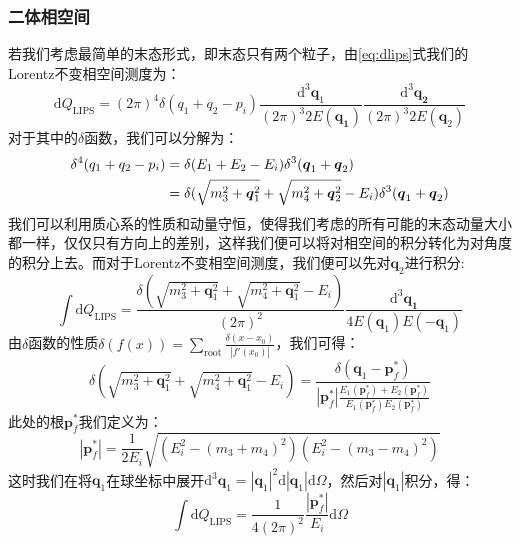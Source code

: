 \subsubsection*{二体相空间}
若我们考虑最简单的末态形式，即末态只有两个粒子，由\eqref{eq:dlips}式我们的Lorentz不变相空间测度为：
\begin{equation}
\mathrm{d}Q_{\text{LIPS}}=(2\pi)^4\delta(q_1+q_2-p_i)\frac{\mathrm{d}^3\boldsymbol{q}_1}{(2\pi)^3 2E(\boldsymbol{q_1})}\frac{\mathrm{d}^3\boldsymbol{q_2}}{(2\pi)^3 2E(\boldsymbol{q}_2)}
\end{equation}
对于其中的$\delta$函数，我们可以分解为：
\begin{align}
\delta^4(q_1+q_2-p_i)&=\delta(E_1+E_2-E_i)\delta^3(\boldsymbol{q}_1+\boldsymbol{q}_2)\notag\\
&=\delta(\sqrt{m_3^2+\boldsymbol{q}_1^2}+\sqrt{m_4^2+\boldsymbol{q}_2^2}-E_i)\delta^3(\boldsymbol{q}_1+\boldsymbol{q}_2)
\end{align}
我们可以利用质心系的性质和动量守恒，使得我们考虑的所有可能的末态动量大小都一样，仅仅只有方向上的差别，这样我们便可以将对相空间的积分转化为对角度的积分上去。而对于Lorentz不变相空间测度，我们便可以先对$\boldsymbol{q}_2$进行积分:
\begin{equation}
\int\mathrm{d}Q_{\text{LIPS}}=\frac{\delta(\sqrt{m_3^2+\boldsymbol{q}_1^2}+\sqrt{m_4^2+\boldsymbol{q}_1^2}-E_i)}{(2\pi)^2}\frac{\mathrm{d}^3\boldsymbol{q_1}}{4E(\boldsymbol{q}_1)E(-\boldsymbol{q}_1)}
\end{equation}
由$\delta$函数的性质$\delta(f(x))=\underset{\text{root}}{\sum}\frac{\delta(x-x_0)}{|f'(x_0)|}$，我们可得：
\begin{equation}
\delta(\sqrt{m_3^2+\boldsymbol{q}_1^2}+\sqrt{m_4^2+\boldsymbol{q}_1^2}-E_i)=\frac{\delta(\boldsymbol{q}_1-\boldsymbol{p}^*_f)}{|\boldsymbol{p}^*_f|\frac{E_1(\boldsymbol{p}^*_f)+E_2(\boldsymbol{p}^*_f)}{E_1(\boldsymbol{p}^*_f)E_2(\boldsymbol{p}^*_f)}}
\end{equation}
\vspace{-1pt}
此处的根$\boldsymbol{p}^*_f$我们定义为：
\begin{equation}
|\boldsymbol{p}^*_f|=\frac{1}{2E_i}\sqrt{(E_i^2-(m_3+m_4)^2)(E_i^2-(m_3-m_4)^2)}
\end{equation}
这时我们在将$\boldsymbol{q}_1$在球坐标中展开$\mathrm{d}^3\boldsymbol{q}_1=|\boldsymbol{q}_1|^2\mathrm{d}|\boldsymbol{q}_1|\mathrm{d}\Omega$，然后对$|\boldsymbol{q}_1|$积分，得：
\begin{equation}
\int\mathrm{d}Q_{\text{LIPS}}=\frac{1}{4(2\pi)^2}\frac{|\boldsymbol{p}^*_f|}{E_i}\mathrm{d}\Omega
\end{equation}
